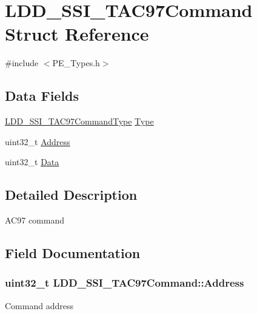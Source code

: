 \hypertarget{struct_l_d_d___s_s_i___t_a_c97_command}{}\section{L\+D\+D\+\_\+\+S\+S\+I\+\_\+\+T\+A\+C97\+Command Struct Reference}
\label{struct_l_d_d___s_s_i___t_a_c97_command}


{\ttfamily \#include $<$P\+E\+\_\+\+Types.\+h$>$}

\subsection*{Data Fields}
\begin{DoxyCompactItemize}
\item 
\hyperlink{group___p_e___types__module_gac7398329f7fdf5c8834b026e63f5edc2}{L\+D\+D\+\_\+\+S\+S\+I\+\_\+\+T\+A\+C97\+Command\+Type} \hyperlink{struct_l_d_d___s_s_i___t_a_c97_command_ac7226beaf57a764f71faf7e822e27a6e}{Type}
\item 
uint32\+\_\+t \hyperlink{struct_l_d_d___s_s_i___t_a_c97_command_a0d39df5cae85e73b036af81e9fbc6332}{Address}
\item 
uint32\+\_\+t \hyperlink{struct_l_d_d___s_s_i___t_a_c97_command_abc16535d09d61f2c3f885adf91632117}{Data}
\end{DoxyCompactItemize}


\subsection{Detailed Description}
A\+C97 command 

\subsection{Field Documentation}
\hypertarget{struct_l_d_d___s_s_i___t_a_c97_command_a0d39df5cae85e73b036af81e9fbc6332}{}
\subsubsection[{Address}]{\setlength{\rightskip}{0pt plus 5cm}uint32\+\_\+t L\+D\+D\+\_\+\+S\+S\+I\+\_\+\+T\+A\+C97\+Command\+::\+Address}\label{struct_l_d_d___s_s_i___t_a_c97_command_a0d39df5cae85e73b036af81e9fbc6332}
Command address \hypertarget{struct_l_d_d___s_s_i___t_a_c97_command_abc16535d09d61f2c3f885adf91632117}{}
